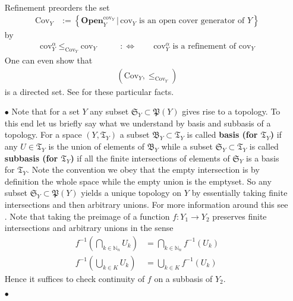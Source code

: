 \begin{exa}
\begin{enumerate}
\begin{align*}
\end{align*}
Refinement preorders the set
\begin{align*}
  \mathrm{Cov}_{Y}
  &:=
  \left\lbrace
      \mathbf{Open}_{Y}^{\mathrm{cov}_{Y}}
    \,
    \vert
    \,
      \mathrm{cov}_{Y}
      \text{ is an open cover generator of }
      Y
  \right\rbrace
\end{align*}
by
\begin{align*}
  \mathrm{cov}_{Y}^{\alpha}
  \leq_{\mathrm{Cov}_{Y}}
  \mathrm{cov}_{Y}
  \qquad
  &:\Leftrightarrow
  \qquad
  \mathrm{cov}_{Y}^{\alpha}
  \text{ is a refinement of }
  \mathrm{cov}_{Y}
\end{align*}
One can even show that
\begin{align*}
  \left(
    \mathrm{Cov}_{Y},
    \leq_{\mathrm{Cov}_{Y}}
  \right)
\end{align*}
is a directed set. See \cite{273ba834} for these particular facts.
\item[$\bullet$]
Note that for a set $Y$ any subset $\mathfrak{S}_{Y} \subset \mathfrak{P}(Y)$ gives rise to a topology. To this end let us briefly say what we understand by basis and subbasis of a topology. For a space $(Y,\mathfrak{T}_{Y})$ a subset $\mathfrak{B}_{Y} \subset \mathfrak{T}_{Y}$ is called \textbf{basis (for $\mathfrak{T}_{Y}$)} if any $U \in \mathfrak{T}_{Y}$ is the union of elements of $\mathfrak{B}_{Y}$ while a subset $\mathfrak{S}_{Y} \subset \mathfrak{T}_{Y}$ is called \textbf{subbasis (for $\mathfrak{T}_{Y}$)} if all the finite intersections of elements of $\mathfrak{S}_{Y}$ is a basis for $\mathfrak{T}_{Y}$. Note the convention we obey that the empty intersection is by definition the whole space while the empty union is the emptyset. So any subset $\mathfrak{S}_{Y} \subset \mathfrak{P}(Y)$ yields a unique topology on $Y$ by essentially taking finite intersections and then arbitrary unions. For more information around this see \cite{273ba834}. Note that taking the preimage of a function $f \colon Y_{1} \rightarrow Y_{2}$ preserves finite intersections and arbitrary unions in the sense
\begin{align*}
  f^{-1}
  \left(
    \bigcap_{k \in \mathbb{N}_{n}}
    U_{k}
  \right)
  &=
  \bigcap_{k \in \mathbb{N}_{n}}
  f^{-1}(U_{k})
  \\
  f^{-1}
  \left(
    \bigcup_{k \in K}
    U_{k}
  \right)
  &=
  \bigcup_{k \in K}
  f^{-1}(U_{k})
\end{align*}
Hence it suffices to check continuity of $f$ on a subbasis of $Y_{2}$.
\item[$\bullet$]

\end{enumerate}
\end{exa}
